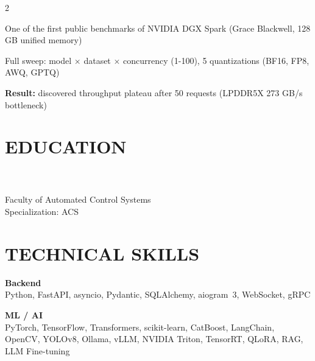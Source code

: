 \documentclass[]{deedy-resume-reversed}
\begin{document}
\begin{paracol}{2}
\\
\begin{tightemize}
\item One of the first public benchmarks of NVIDIA DGX Spark (Grace Blackwell, 128 GB unified memory)
\item Full sweep: model $\times$ dataset $\times$ concurrency (1-100), 5 quantizations (BF16, FP8, AWQ, GPTQ)
\item \textbf{Result:} discovered throughput plateau after 50 requests (LPDDR5X 273 GB/s bottleneck)
\end{tightemize}


\switchcolumn

\section{EDUCATION}

\\
\\[2pt]
{\fontsize{9pt}{11pt}\selectfont Faculty of Automated Control Systems\\
Specialization: ACS}
\sectionsep


\section{TECHNICAL SKILLS}

{\fontsize{9pt}{11pt}\selectfont
\textbf{Backend}\\
Python, FastAPI, asyncio, Pydantic, SQLAlchemy, aiogram~3, WebSocket, gRPC
\vspace{4pt}

\textbf{ML / AI}\\
PyTorch, TensorFlow, Transformers, scikit-learn, CatBoost, LangChain, OpenCV, YOLOv8, Ollama, vLLM, NVIDIA Triton, TensorRT, QLoRA, RAG, LLM Fine-tuning
\vspace{4pt}

}
\end{paracol}
\end{document}
